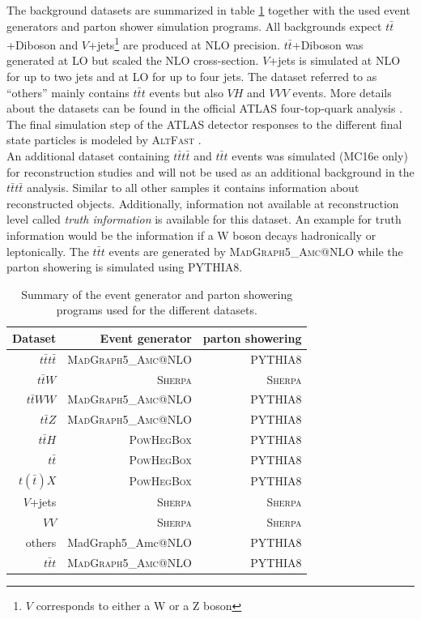 The background datasets are summarized in table \ref{tab:generatros} together with the used event generators and parton shower simulation programs. All backgrounds expect $t\bar{t}$+Diboson and $V$+jets\footnote{$V$ corresponds to either a W or a Z boson} are produced at NLO precision. $t\bar{t}$+Diboson was generated at LO but scaled the NLO cross-section. $V$+jets is simulated at NLO for up to two jets and at LO for up to four jets. The dataset referred to as ``others'' mainly contains $t\bar{t}t$ events but also $VH$ and $VVV$ events. More details about the datasets can be found in the official ATLAS four-top-quark analysis \cite{cross5}. The final simulation step of the ATLAS detector responses to the different final state particles is modeled by {\scshape AltFast}  \cite{AltFast}. \\
An additional dataset containing $t\bar{t}t\bar{t}$ and $t\bar{t}t$ events was simulated (MC16e only) for reconstruction studies and will not be used as an additional background in the $t\bar{t}t\bar{t}$ analysis. Similar to all other samples it contains information about reconstructed objects. Additionally, information not available at reconstruction level called \textit{truth information} is available for this dataset. An example for truth information would be the information if a W boson decays hadronically or leptonically. The $t\bar{t}t$ events are generated by {\scshape MadGraph5\_Amc@NLO} while the parton showering is simulated using {\scshape PYTHIA8}. 

\begin{table}[H]
\centering
\begin{tabular}{|r|r|r|}
\toprule
Dataset & Event generator & parton showering \\
\midrule
\midrule
$t\bar{t}t\bar{t}$ & \scshape MadGraph5\_Amc@NLO & \scshape PYTHIA8 \\
$t\bar{t}W$ & \scshape Sherpa \cite{Sherpa} & \scshape Sherpa \\
$t\bar{t}WW$ & \scshape MadGraph5\_Amc@NLO & \scshape PYTHIA8 \\
$t\bar{t}Z$ & \scshape MadGraph5\_Amc@NLO & \scshape PYTHIA8 \\
$t\bar{t}H$ & \scshape PowHegBox \cite{PowHeg} & \scshape PYTHIA8 \\
$t\bar{t}$ & \scshape PowHegBox & \scshape PYTHIA8 \\
$t(\bar{t})X$ & \scshape PowHegBox & \scshape PYTHIA8 \\
$V$+jets & \scshape Sherpa & \scshape Sherpa \\
$VV$ & \scshape Sherpa & \scshape Sherpa \\
others & MadGraph5\_Amc@NLO & \scshape PYTHIA8 \\
$t\bar{t}t$ & \scshape MadGraph5\_Amc@NLO & \scshape PYTHIA8 \\
\bottomrule
\end{tabular}
\caption{Summary of the event generator and parton showering programs used for the different datasets.}
\label{tab:generatros}
\end{table}

